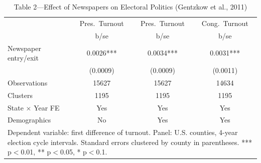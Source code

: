 \begin{table}[htbp]\centering
\def\sym#1{\ifmmode^{#1}\else\(^{#1}\)\fi}
\caption{Table 2---Effect of Newspapers on Electoral Politics (Gentzkow et al., 2011)}
\begin{tabular}{l*{3}{c}}
\toprule
            &\multicolumn{1}{c}{Pres.~Turnout}&\multicolumn{1}{c}{Pres.~Turnout}&\multicolumn{1}{c}{Cong.~Turnout}\\
            &        b/se   &        b/se   &        b/se   \\
\midrule
Newspaper entry/exit&      0.0026***&      0.0034***&      0.0031***\\
            &    (0.0009)   &    (0.0009)   &    (0.0011)   \\
\midrule
Observations&       15627   &       15627   &       14634   \\
Clusters    &        1195   &        1195   &        1195   \\
State $\times$ Year FE&         Yes   &         Yes   &         Yes   \\
Demographics&          No   &         Yes   &         Yes   \\
\bottomrule
\multicolumn{4}{l}{\footnotesize Dependent variable: first difference of turnout.  Panel: U.S. counties, 4-year election cycle intervals.  Standard errors clustered by county in parentheses.  *** p$<$0.01, ** p$<$0.05, * p$<$0.1.}\\
\end{tabular}
\end{table}
